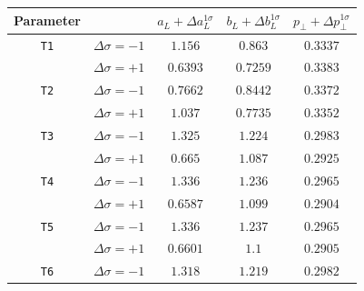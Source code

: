 \documentclass[aps,preprint,floatfix,nofootinbib,showpacs]{revtex4-1}
\begin{document}
\begin{table}[!h]
 \begin{center}
 \begin{tabular}{ c | c | c | c | c  }
 \hline \hline
  Parameter   & & \hspace{0.4cm} $a_L + \Delta a_L^{1\sigma}$ \hspace{0.4cm}   & \hspace{0.4cm} $b_L + \Delta b_L^{1\sigma}$ \hspace{0.4cm} & \hspace{0.4cm} $p_\perp + \Delta p_\perp^{1\sigma}$ \hspace{0.4cm} \\ \hline \hline
  \texttt{T1} & $\Delta\sigma=-1$ \hspace{0.5cm}  & $1.156$   & $0.863$  & $0.3337$ \\ 
              & $\Delta\sigma=+1$ \hspace{0.5cm}  & $0.6393$  & $0.7259$ & $0.3383$ \\ \hline \hline
  \texttt{T2} & $\Delta\sigma=-1$ \hspace{0.5cm}  & $0.7662$  & $0.8442$ & $0.3372$ \\ 
              & $\Delta\sigma=+1$ \hspace{0.5cm}  & $1.037$   & $0.7735$ & $0.3352$ \\ \hline \hline
  \texttt{T3} & $\Delta\sigma=-1$ \hspace{0.5cm}  & $1.325$   & $1.224$  & $0.2983$ \\ 
              & $\Delta\sigma=+1$ \hspace{0.5cm}  & $0.665$   & $1.087$  & $0.2925$ \\ \hline \hline
  \texttt{T4} & $\Delta\sigma=-1$ \hspace{0.5cm}  & $1.336$   & $1.236$  & $0.2965$ \\ 
              & $\Delta\sigma=+1$ \hspace{0.5cm}  & $0.6587$  & $1.099$  & $0.2904$ \\ \hline \hline
  \texttt{T5} & $\Delta\sigma=-1$ \hspace{0.5cm}  & $1.336$   & $1.237$  & $0.2965$ \\ 
              & $\Delta\sigma=+1$ \hspace{0.5cm}  & $0.6601$  & $1.1$    & $0.2905$ \\ \hline \hline
  \texttt{T6} & $\Delta\sigma=-1$ \hspace{0.5cm}  & $1.318$   & $1.219$  & $0.2982$ \\ 

\end{tabular}
\end{center}
\end{table}
\end{document}
